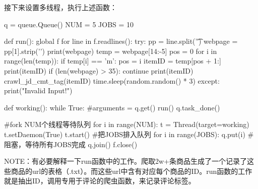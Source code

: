 接下来设置多线程，执行上述函数：
\begin{python}
q = queue.Queue()
NUM = 5
JOBS = 10

def run():
    global f
    for line in f.readlines():
        try:
            pp = line.split('\t')
            webpage = pp[1].strip('\n')
            print(webpage)
            temp = webpage[14:-5]
            pos = 0
            for i in range(len(temp)):
                if temp[i] == 'm':
                    pos = i
            itemID = temp[pos + 1:]
            print(itemID)
            if (len(webpage) > 35):
                continue
            print(itemID)
            crawl_jd_cmt_tag(itemID)
            time.sleep(random.random() * 3)
        except:
            print("Invalid Input!")

def working():
    while True:
        #arguments = q.get()
        run()
        q.task_done()


#fork NUM个线程等待队列
for i in range(NUM):
    t = Thread(target=working)
    t.setDaemon(True)
    t.start()
#把JOBS排入队列
for i in range(JOBS):
    q.put(i)
#阻塞，等待所有JOBS完成
q.join()
f.close()
\end{python}
NOTE：有必要解释一下run函数中的工作。爬取2w+条商品生成了一个记录了这些商品的url的表格（.txt）。而这些url中含有对应每个商品的ID。run函数的工作就是抽出ID，调用专用于评论的爬虫函数，来记录评论标签。


